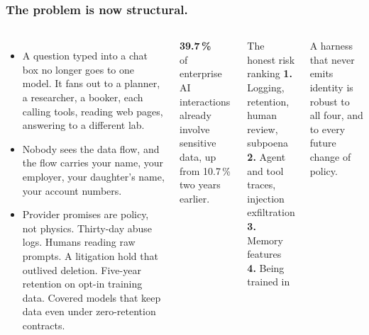 \documentclass[aspectratio=169,10pt]{beamer}
\newcommand{\slideeyebrow}{}
\newcommand{\slide}[2]{\renewcommand{\slideeyebrow}{#1}\frametitle{#2}}
\newcommand{\bignum}[1]{{\fontsize{21}{23}\selectfont\bfseries\color{indigo}#1}}
\begin{document}
\begin{frame}[shrink=20]
\slide{01}{The problem is now structural.}
\begin{columns}[T]
\begin{itemize}
\item A question typed into a chat box no longer goes to one model. It fans out to a planner, a researcher, a booker, each calling tools, reading web pages, answering to a different lab.
\item Nobody sees the data flow, and the flow carries your name, your employer, your daughter's name, your account numbers.
\item Provider promises are policy, not physics. Thirty-day abuse logs. Humans reading raw prompts. A litigation hold that outlived deletion. Five-year retention on opt-in training data. Covered models that keep data even under zero-retention contracts.
\end{itemize}
\vspace{2mm}
\bignum{39.7\,\%}\\[1pt]
{\footnotesize of enterprise AI interactions already involve sensitive data, up from 10.7\,\% two years earlier.}
\begin{callout}[coral]{The honest risk ranking}
\textbf{1.} Logging, retention, human review, subpoena\\
\textbf{2.} Agent and tool traces, injection exfiltration\\
\textbf{3.} Memory features\\
\textbf{4.} Being trained in
\end{callout}
\vspace{2mm}
{\footnotesize A harness that never emits identity is robust to all four, and to every future change of policy.}
\end{columns}
\end{frame}
\end{document}
